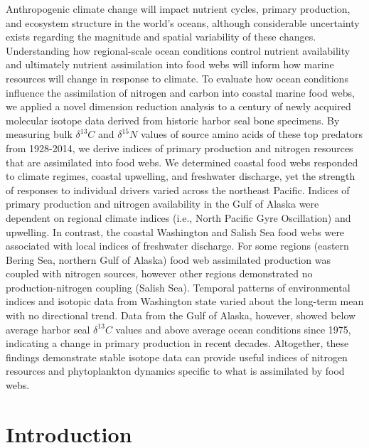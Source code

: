 \documentclass [11pt, proquest] {uwthesis}[2015/03/03]
\begin{document}
Anthropogenic climate change will impact nutrient cycles, primary
production, and ecosystem structure in the world's oceans, although
considerable uncertainty exists regarding the magnitude and spatial
variability of these changes. Understanding how regional-scale ocean
conditions control nutrient availability and ultimately nutrient
assimilation into food webs will inform how marine resources will change
in response to climate. To evaluate how ocean conditions influence the
assimilation of nitrogen and carbon into coastal marine food webs, we
applied a novel dimension reduction analysis to a century of newly
acquired molecular isotope data derived from historic harbor seal bone
specimens. By measuring bulk \(\delta^{13}C\) and \(\delta^{15}N\)
values of source amino acids of these top predators from 1928-2014, we
derive indices of primary production and nitrogen resources that are
assimilated into food webs. We determined coastal food webs responded to
climate regimes, coastal upwelling, and freshwater discharge, yet the
strength of responses to individual drivers varied across the northeast
Pacific. Indices of primary production and nitrogen availability in the
Gulf of Alaska were dependent on regional climate indices (i.e., North
Pacific Gyre Oscillation) and upwelling. In contrast, the coastal
Washington and Salish Sea food webs were associated with local indices
of freshwater discharge. For some regions (eastern Bering Sea, northern
Gulf of Alaska) food web assimilated production was coupled with
nitrogen sources, however other regions demonstrated no
production-nitrogen coupling (Salish Sea). Temporal patterns of
environmental indices and isotopic data from Washington state varied
about the long-term mean with no directional trend. Data from the Gulf
of Alaska, however, showed below average harbor seal \(\delta^{13}C\)
values and above average ocean conditions since 1975, indicating a
change in primary production in recent decades. Altogether, these
findings demonstrate stable isotope data can provide useful indices of
nitrogen resources and phytoplankton dynamics specific to what is
assimilated by food webs.

\section{Introduction}\label{introduction-2}
\end{document}
